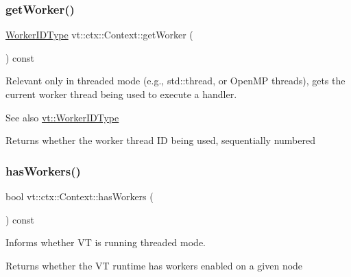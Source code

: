 \subsubsection{\texorpdfstring{get\+Worker()}{getWorker()}}
{\footnotesize\ttfamily \hyperlink{namespacevt_a656e362091da17b9b93d0655b36e3392}{Worker\+I\+D\+Type} vt\+::ctx\+::\+Context\+::get\+Worker (\begin{DoxyParamCaption}{ }\end{DoxyParamCaption}) const\hspace{0.3cm}{\ttfamily [inline]}}



Relevant only in threaded mode (e.\+g., {\ttfamily std\+::thread}, or Open\+MP threads), gets the current worker thread being used to execute a handler. 

\begin{DoxySeeAlso}{See also}
{\ttfamily \hyperlink{namespacevt_a656e362091da17b9b93d0655b36e3392}{vt\+::\+Worker\+I\+D\+Type}} 
\end{DoxySeeAlso}
\begin{DoxyReturn}{Returns}
whether the worker thread ID being used, sequentially numbered 
\end{DoxyReturn}
\mbox{\label{structvt_1_1ctx_1_1_context_a17b1fd9fd7bfc2afdd55707d1f321f76}} 
\subsubsection{\texorpdfstring{has\+Workers()}{hasWorkers()}}
{\footnotesize\ttfamily bool vt\+::ctx\+::\+Context\+::has\+Workers (\begin{DoxyParamCaption}{ }\end{DoxyParamCaption}) const\hspace{0.3cm}{\ttfamily [inline]}}



Informs whether VT is running threaded mode. 

\begin{DoxyReturn}{Returns}
whether the VT runtime has workers enabled on a given node 
\end{DoxyReturn}
\mbox{\label{structvt_1_1ctx_1_1_context_a6bef35c171d45feb409d7b6aa6168996}} 

